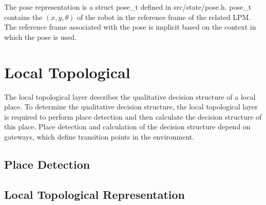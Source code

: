 \documentclass{article}
\begin{document}
The pose representation is a struct pose\_t defined in src/state/pose.h. pose\_t contains the $(x,y,\theta)$ of the
robot in the reference frame of the related LPM. The reference frame associated with the pose is implicit based on the
context in which the pose is used.

\section{Local Topological}
The local topological layer describes the qualitative decision structure of a local place. To determine the qualitative
decision structure, the local topological layer is required to perform place detection and then calculate the decision
structure of this place. Place detection and calculation of the decision structure depend on gateways, which define
transition points in the environment.

\subsection{Place Detection}

\subsection{Local Topological Representation}
\end{document}
